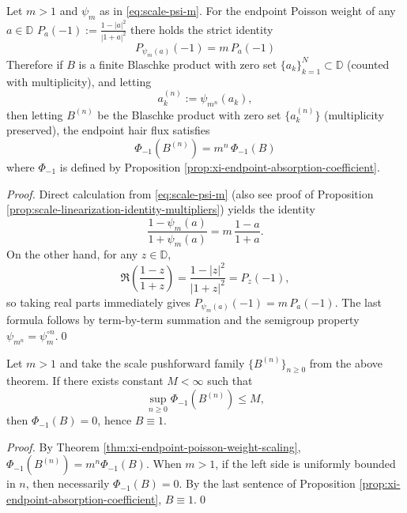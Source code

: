 \begin{theorem}\label{thm:xi-endpoint-poisson-weight-scaling}
Let \(m>1\) and \(\psi_m\) as in \eqref{eq:scale-psi-m}.
For the endpoint Poisson weight of any \(a\in\mathbb{D}\)
\(
P_a(-1):=\frac{1-|a|^2}{|1+a|^2}
\)
there holds the strict identity
\[
\boxed{\;P_{\psi_m(a)}(-1)=m\,P_a(-1)\;}
\]
Therefore if \(B\) is a finite Blaschke product with zero set \(\{a_k\}_{k=1}^{N}\subset\mathbb{D}\) (counted with multiplicity), and letting
\[
a_k^{(n)}:=\psi_{m^n}(a_k),
\]
then letting \(B^{(n)}\) be the Blaschke product with zero set \(\{a_k^{(n)}\}\) (multiplicity preserved), the endpoint hair flux satisfies
\[
\boxed{\;\Phi_{-1}(B^{(n)})=m^n\,\Phi_{-1}(B)\;}
\]
where \(\Phi_{-1}\) is defined by Proposition \ref{prop:xi-endpoint-absorption-coefficient}.
\end{theorem}

\begin{proof}
Direct calculation from \eqref{eq:scale-psi-m} (also see proof of Proposition \ref{prop:scale-linearization-identity-multipliers}) yields the identity
\[
\frac{1-\psi_m(a)}{1+\psi_m(a)}=m\,\frac{1-a}{1+a}.
\]
On the other hand, for any \(z\in\mathbb{D}\),
\[
\Re\!\left(\frac{1-z}{1+z}\right)=\frac{1-|z|^2}{|1+z|^2}=P_z(-1),
\]
so taking real parts immediately gives \(P_{\psi_m(a)}(-1)=m\,P_a(-1)\).
The last formula follows by term-by-term summation and the semigroup property \(\psi_{m^n}=\psi_m^{\circ n}\).\qed
\end{proof}

\begin{corollary}[Cross-scale closure \texorpdfstring{$\Longrightarrow$}{=>} no-hair fixed point]\label{cor:xi-nohair-fixedpoint-flux-closure}
Let \(m>1\) and take the scale pushforward family \(\{B^{(n)}\}_{n\ge 0}\) from the above theorem.
If there exists constant \(M<\infty\) such that
\[
\sup_{n\ge 0}\Phi_{-1}(B^{(n)})\le M,
\]
then \(\Phi_{-1}(B)=0\), hence \(B\equiv 1\).
\end{corollary}

\begin{proof}
By Theorem \ref{thm:xi-endpoint-poisson-weight-scaling}, \(\Phi_{-1}(B^{(n)})=m^n\Phi_{-1}(B)\).
When \(m>1\), if the left side is uniformly bounded in \(n\), then necessarily \(\Phi_{-1}(B)=0\).
By the last sentence of Proposition \ref{prop:xi-endpoint-absorption-coefficient}, \(B\equiv 1\).\qed
\end{proof}

